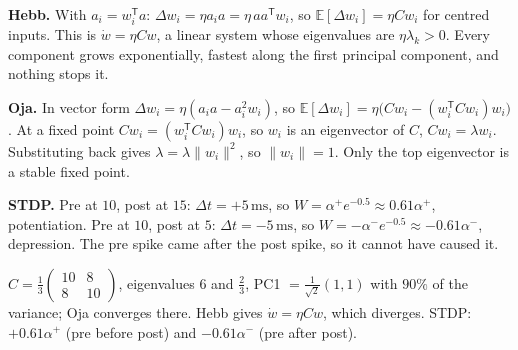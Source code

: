 \documentclass[11pt,letterpaper]{article}
\newcommand{\T}{\mathsf{T}}
\newcommand{\ans}[1]{\par\vspace{4pt}{\bfseries #1}\quad}
\begin{document}
\ans{Q2}
\textbf{Hebb.} With $a_i = w_i^\T a$: $\Delta w_i = \eta a_ia = \eta\,a a^\T w_i$, so $\mathbb{E}[\Delta w_i] = \eta Cw_i$ for centred inputs. This is $\dot w = \eta Cw$, a linear system whose eigenvalues are $\eta\lambda_k > 0$. Every component grows exponentially, fastest along the first principal component, and nothing stops it.

\textbf{Oja.} In vector form $\Delta w_i = \eta(a_ia - a_i^2 w_i)$, so $\mathbb{E}[\Delta w_i] = \eta\bigl(Cw_i - (w_i^\T Cw_i)w_i\bigr)$. At a fixed point $Cw_i = (w_i^\T Cw_i)w_i$, so $w_i$ is an eigenvector of $C$, $Cw_i = \lambda w_i$. Substituting back gives $\lambda = \lambda\|w_i\|^2$, so $\|w_i\| = 1$. Only the top eigenvector is a stable fixed point.

\textbf{STDP.} Pre at $10$, post at $15$: $\Delta t = +5\,\mathrm{ms}$, so $W = \alpha^+e^{-0.5} \approx 0.61\alpha^+$, potentiation. Pre at $10$, post at $5$: $\Delta t = -5\,\mathrm{ms}$, so $W = -\alpha^-e^{-0.5} \approx -0.61\alpha^-$, depression. The pre spike came after the post spike, so it cannot have caused it.
\begin{center}
\end{center}
\begin{result}
$C = \frac13\begin{pmatrix}10 & 8\\8 & 10\end{pmatrix}$, eigenvalues $6$ and $\tfrac23$, PC1 $= \tfrac{1}{\sqrt2}(1, 1)$ with $90\%$ of the variance; Oja converges there. Hebb gives $\dot w = \eta Cw$, which diverges. STDP: $+0.61\alpha^+$ (pre before post) and $-0.61\alpha^-$ (pre after post).
\end{result}
\end{document}
